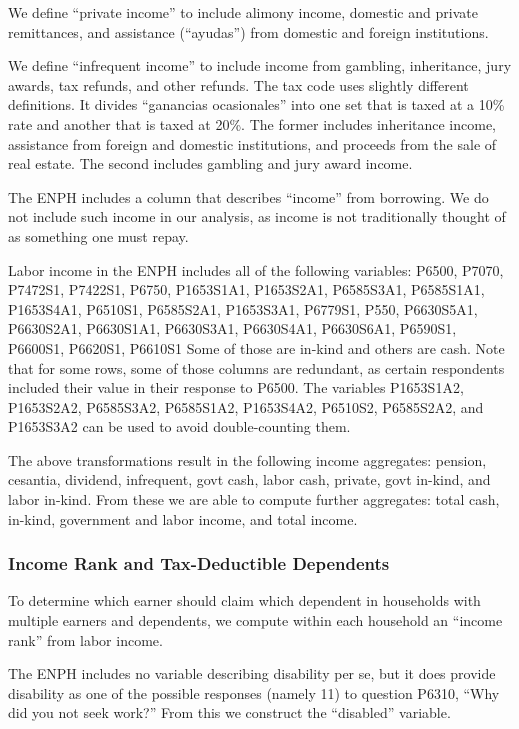 \documentclass[12pt]{article}
\begin{document}
\begin{appendices}
We define ``private income'' to include alimony income, domestic and private remittances, and assistance (``ayudas'') from domestic and foreign institutions.

We define ``infrequent income'' to include income from gambling, inheritance, jury awards, tax refunds, and other refunds.
The tax code uses slightly different definitions.
It divides ``ganancias ocasionales'' into one set that is taxed at a 10\% rate and another that is taxed at 20\%.
The former includes inheritance income, assistance from foreign and domestic institutions, and proceeds from the sale of real estate.
The second includes gambling and jury award income.

The ENPH includes a column that describes ``income'' from borrowing.
We do not include such income in our analysis, as income is not traditionally thought of as something one must repay.

Labor income in the ENPH includes all of the following variables:
P6500, P7070, P7472S1, P7422S1, P6750, P1653S1A1, P1653S2A1, P6585S3A1, P6585S1A1, P1653S4A1, P6510S1, P6585S2A1, P1653S3A1, P6779S1, P550, P6630S5A1, P6630S2A1, P6630S1A1, P6630S3A1, P6630S4A1, P6630S6A1, P6590S1, P6600S1, P6620S1, P6610S1
Some of those are in-kind and others are cash.
Note that for some rows, some of those columns are redundant, as certain respondents included their value in their response to P6500.
The variables P1653S1A2, P1653S2A2, P6585S3A2, P6585S1A2, P1653S4A2, P6510S2, P6585S2A2, and P1653S3A2 can be used to avoid double-counting them.

The above transformations result in the following income aggregates:
pension, cesantia, dividend, infrequent, govt cash, labor cash, private, govt in-kind, and labor in-kind.
From these we are able to compute further aggregates: total cash, in-kind, government and labor income, and total income.

\subsubsection {Income Rank and Tax-Deductible Dependents}
To determine which earner should claim which dependent in households with multiple earners and dependents, we compute within each household an ``income rank'' from labor income.

The ENPH includes no variable describing disability per se, but it does provide disability as one of the possible responses (namely 11) to question P6310, ``Why did you not seek work?''
From this we construct the ``disabled'' variable.


\end{appendices}
\end{document}
